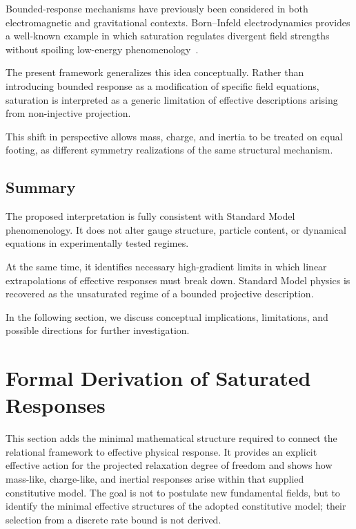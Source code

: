\documentclass[pdflatex,sn-mathphys-num]{sn-jnl} %
\theoremstyle{remark}
\begin{document}
      Bounded-response mechanisms have previously been considered in both
      electromagnetic and gravitational contexts.
      Born--Infeld electrodynamics provides a well-known example in which saturation
      regulates divergent field strengths without spoiling low-energy
      phenomenology~\cite{BornInfeld1934}.

      The present framework generalizes this idea conceptually.
      Rather than introducing bounded response as a modification of specific field
      equations, saturation is interpreted as a generic limitation of effective
      descriptions arising from non-injective projection.

      This shift in perspective allows mass, charge, and inertia to be treated on
      equal footing, as different symmetry realizations of the same structural
      mechanism.

    \subsection{Summary}
      \label{subsec:consistency-summary}

      The proposed interpretation is fully consistent with Standard Model
      phenomenology.
      It does not alter gauge structure, particle content, or dynamical equations in
      experimentally tested regimes.

      At the same time, it identifies necessary high-gradient limits in which
      linear extrapolations of effective responses must break down.
      Standard Model physics is recovered as the unsaturated regime of a bounded
      projective description.

      In the following section, we discuss conceptual implications, limitations, and
      possible directions for further investigation.

  \section{Formal Derivation of Saturated Responses}
    \label{sec:formal_derivation}

    This section adds the minimal mathematical structure required to connect the relational
    framework to effective physical response.
    It provides an explicit effective action for the projected relaxation degree of freedom and
    shows how mass-like, charge-like, and inertial responses arise within that supplied
    constitutive model.
    The goal is not to postulate new fundamental fields, but to identify the minimal effective
    structures of the adopted constitutive model; their selection from a discrete rate bound is not derived.
\end{document}
